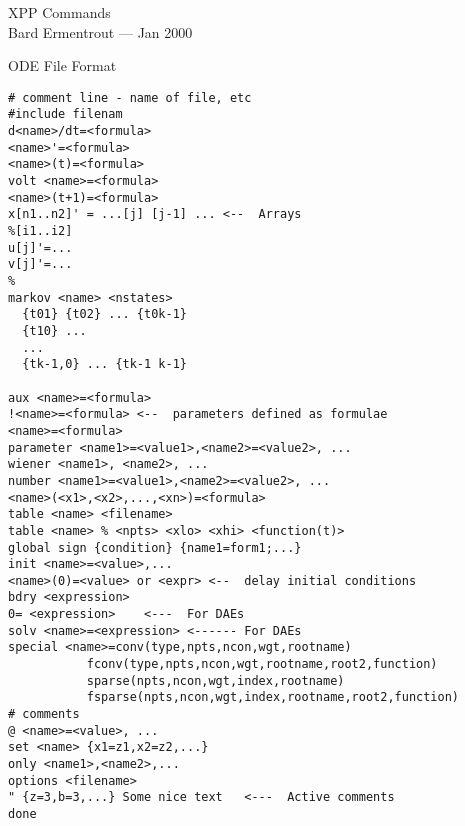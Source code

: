 \setlength{\topmargin}{-.5 in}
\setlength{\oddsidemargin}{ 0.1 in}
\setlength{\textheight}{ 8.75 in}
\setlength{\textwidth}{6.8in}
\newcommand{\beq}{\begin{equation}}
\newcommand{\eeq}{\end{equation}}
\newcommand{\beqa}{\begin{eqnarray}}
\newcommand{\eeqa}{\end{eqnarray}}
\newcommand{\bvb}{\begin{verbatim}}
\newcommand{\evb}{\end{verbatim}}
\newcommand{\beqann}{\begin{eqnarray*}}
\newcommand{\eeqann}{\end{eqnarray*}}
\newcommand{\nn}{\mbox{${\nonumber}$}}
\newcommand{\labeq}[1]{\label{eq:#1}}
\newcommand{\refeq}[1]{(\ref{eq:#1})}

\begin{center} {\Large XPP Commands} \\
Bard Ermentrout   ---  Jan 2000
\end{center}

\begin{center} {\large ODE File Format}\end{center}
\begin{verbatim}
# comment line - name of file, etc
#include filenam   
d<name>/dt=<formula>
<name>'=<formula>
<name>(t)=<formula>
volt <name>=<formula>
<name>(t+1)=<formula>
x[n1..n2]' = ...[j] [j-1] ... <--  Arrays
%[i1..i2]
u[j]'=...
v[j]'=...
% 
markov <name> <nstates>
  {t01} {t02} ... {t0k-1}
  {t10} ...
  ...
  {tk-1,0} ... {tk-1 k-1}

aux <name>=<formula>
!<name>=<formula> <--  parameters defined as formulae
<name>=<formula>
parameter <name1>=<value1>,<name2>=<value2>, ...
wiener <name1>, <name2>, ...
number <name1>=<value1>,<name2>=<value2>, ...
<name>(<x1>,<x2>,...,<xn>)=<formula>
table <name> <filename>
table <name> % <npts> <xlo> <xhi> <function(t)>
global sign {condition} {name1=form1;...}
init <name>=<value>,...
<name>(0)=<value> or <expr> <--  delay initial conditions
bdry <expression>
0= <expression>    <---  For DAEs
solv <name>=<expression> <------ For DAEs
special <name>=conv(type,npts,ncon,wgt,rootname)
	       fconv(type,npts,ncon,wgt,rootname,root2,function)
	       sparse(npts,ncon,wgt,index,rootname)
	       fsparse(npts,ncon,wgt,index,rootname,root2,function)
# comments
@ <name>=<value>, ...
set <name> {x1=z1,x2=z2,...}
only <name1>,<name2>,...
options <filename>
" {z=3,b=3,...} Some nice text   <---  Active comments 
done
\end{verbatim}
       
